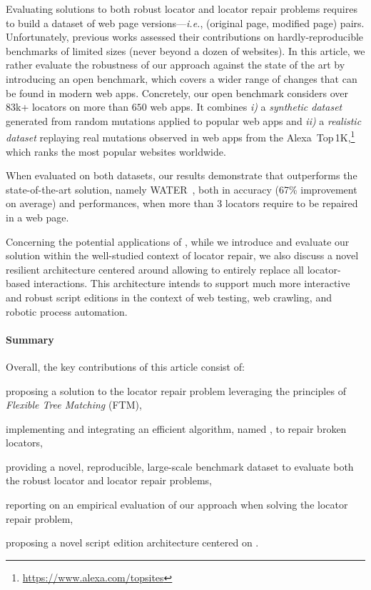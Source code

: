 \documentclass[preprint, 12pt]{elsarticle}
\begin{document}
Evaluating solutions to both robust locator and locator repair problems requires to build a dataset of web page versions---\emph{i.e.}, \textsf{(original page, modified page)} pairs.
Unfortunately, previous works assessed their contributions on hardly-reproducible benchmarks of limited sizes (never beyond a dozen of websites).
In this article, we rather evaluate the robustness of our approach against the state of the art by introducing an open benchmark, which covers a wider range of changes that can be found in modern web apps.
Concretely, our open benchmark considers over 83k+ locators on more than $650$ web apps.
It combines \emph{i)} a \emph{synthetic dataset} generated from random mutations applied to popular web apps and \emph{ii)} a \emph{realistic dataset} replaying real mutations observed in web apps from the Alexa~Top\,1K,\footnote{\url{https://www.alexa.com/topsites}} which ranks the most popular websites worldwide.

When evaluated on both datasets, our results demonstrate that \erratum{} outperforms the state-of-the-art solution, namely WATER~\cite{choudhary2011water}, both in accuracy (67\% improvement on average) and performances, when more than 3 locators require to be repaired in a web page.

Concerning the potential applications of \erratum, while we introduce and evaluate our solution within the well-studied context of locator repair, we also discuss a novel resilient architecture centered around \erratum allowing to entirely replace all locator-based interactions.
This architecture intends to support much more interactive and robust script editions in the context of web testing, web crawling, and robotic process automation.

\paragraph{Summary}
Overall, the key contributions of this article consist of:
\begin{compactenum}
    \item proposing a solution to the locator repair problem leveraging the principles of \emph{Flexible Tree Matching} (FTM),
    \item implementing and integrating an efficient algorithm, named \erratum, to repair broken locators,
    \item providing a novel, reproducible, large-scale benchmark dataset to evaluate both the robust locator and locator repair problems,
    \item reporting on an empirical evaluation of our approach when solving the locator repair problem,
    \item proposing a novel script edition architecture centered on \erratum.
\end{compactenum}
\end{document}
